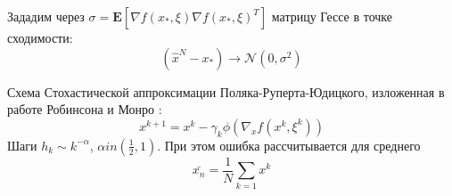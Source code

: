 Зададим через $\sigma = \mathbf{E}\left[\nabla f(x_*,\xi)\nabla f(x_*, \xi)^T\right]$ матрицу Гессе в точке сходимости:
\begin{equation}
    (\hat{x}^N - x_*) \rightarrow \mathcal{N}(0,\sigma^2)
\end{equation}

Схема Стохастической аппроксимации Поляка-Руперта-Юдицкого, изложенная в работе Робинсона и 
Монро \cite{robbins1951stochastic}:
\begin{equation}
    x^{k+1} = x^{k} - \gamma_k \phi(\nabla_x f(x^k,\xi^k))
\end{equation}
Шаги $h_k \sim k^{-\alpha}$, $\alpha in (\frac{1}{2},1)$.
При этом ошибка рассчитывается для среднего
\begin{equation}
    \bar{x_n} = \frac{1}{N} \sum_{k=1} x^k
\end{equation}



